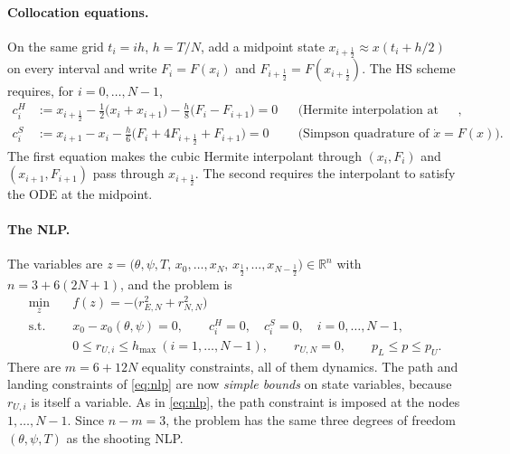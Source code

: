 \documentclass[11pt]{article}
\newcommand{\R}{\mathbb{R}}
\begin{document}
\paragraph{Collocation equations.} On the same grid $t_i = ih$, $h = T/N$, add a midpoint state
$x_{i+\frac12}\approx x(t_i + h/2)$ on every interval and write $F_i = F(x_i)$ and
$F_{i+\frac12} = F(x_{i+\frac12})$. The HS scheme requires, for $i = 0,\dots,N-1$,
\begin{equation}
\begin{aligned}
  c^{H}_i &:= x_{i+\frac12} - \tfrac12\bigl(x_i + x_{i+1}\bigr) - \tfrac h8\bigl(F_i - F_{i+1}\bigr) = 0
      &&\text{(Hermite interpolation at the midpoint)},\\
  c^{S}_i &:= x_{i+1} - x_i - \tfrac h6\bigl(F_i + 4F_{i+\frac12} + F_{i+1}\bigr) = 0
      &&\text{(Simpson quadrature of } \dot x = F(x)).
\end{aligned}
\tag{hs}\label{eq:hs}
\end{equation}
The first equation makes the cubic Hermite interpolant through $(x_i,F_i)$ and $(x_{i+1},F_{i+1})$
pass through $x_{i+\frac12}$. The second requires the interpolant to satisfy the ODE at the
midpoint.

\paragraph{The NLP.} The variables are
$z = \bigl(\theta,\psi,T,\,x_0,\dots,x_N,\,x_{\frac12},\dots,x_{N-\frac12}\bigr)\in\R^{n}$ with
$n = 3 + 6(2N+1)$, and the problem is
\begin{equation}
\begin{aligned}
  \min_{z}\quad & f(z) = -\bigl(r_{E,N}^2 + r_{N,N}^2\bigr)\\
  \text{s.t.}\quad & x_0 - x_0(\theta,\psi) = 0,\qquad c^H_i = 0,\quad c^S_i = 0,\quad i = 0,\dots,N-1,\\
  & 0 \le r_{U,i} \le h_{\max}\ (i = 1,\dots,N-1),\qquad r_{U,N} = 0,\qquad p_L \le p \le p_U .
\end{aligned}
\tag{nlp-hs}\label{eq:nlp-hs}
\end{equation}
There are $m = 6 + 12N$ equality constraints, all of them dynamics. The path and landing
constraints of \eqref{eq:nlp} are now \emph{simple bounds} on state variables, because $r_{U,i}$ is
itself a variable. As in \eqref{eq:nlp}, the path constraint is imposed at the nodes $1,\dots,N-1$.
Since $n - m = 3$, the problem has the same three degrees of freedom $(\theta,\psi,T)$ as the
shooting NLP.
\end{document}
